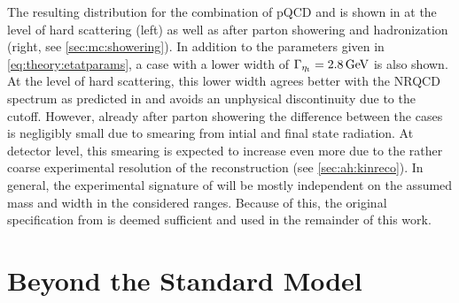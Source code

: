 The resulting \mWWbb distribution for the combination of pQCD \ttbar and \etat is shown in  at the level of hard scattering (left) as well as after parton showering and hadronization (right, see \cref{sec:mc:showering}). In addition to the parameters given in \cref{eq:theory:etatparams}, a case with a lower width of $\Gamma_{\etat} = \SI{2.8}{\GeV}$ is also shown. At the level of hard scattering, this lower width agrees better with the NRQCD spectrum as predicted in  and avoids an unphysical discontinuity due to the \mWWbb cutoff. However, already after parton showering the difference between the cases is negligibly small due to smearing from intial and final state radiation. At detector level, this smearing is expected to increase even more due to the rather coarse experimental resolution of the \mtt reconstruction (see \cref{sec:ah:kinreco}). In general, the experimental signature of \etat will be mostly independent on the assumed mass and width in the considered ranges. Because of this, the original specification from  is deemed sufficient and used in the remainder of this work.









\section{Beyond the Standard Model}
\label{sec:theory:bsm}

